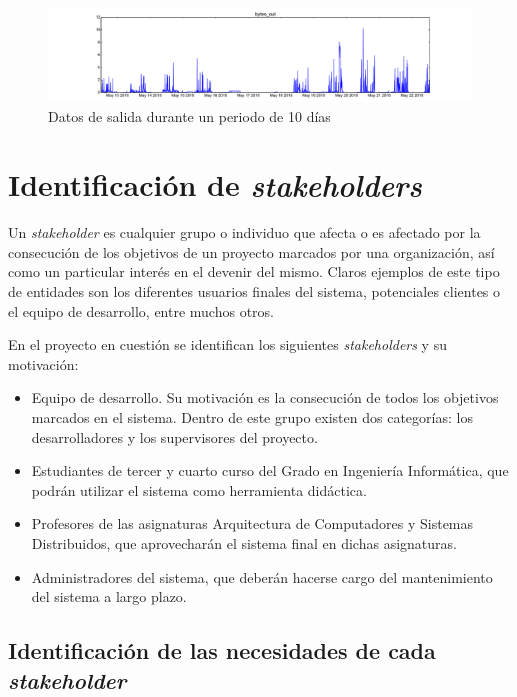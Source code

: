 \begin{figure}[H]
\centering
\includegraphics[width=\textwidth]{Chapters/Chapter4/Figures/data/bytes_out-2015-05-12_11:56:26-2015-05-22_12:56:12}
\caption{Datos de salida durante un periodo de 10 días}
\end{figure}

\section{Identificación de \textit{stakeholders}}

Un \textit{stakeholder} es cualquier grupo o individuo que afecta o es afectado por la consecución de los objetivos de un proyecto marcados por una organización, así como un particular interés en el devenir del mismo. Claros ejemplos de este tipo de entidades son los diferentes usuarios finales del sistema, potenciales clientes o el equipo de desarrollo, entre muchos otros.

En el proyecto en cuestión se identifican los siguientes \textit{stakeholders} y su motivación:

\begin{itemize}
  \item Equipo de desarrollo. Su motivación es la consecución de todos los objetivos marcados en el sistema. Dentro de este grupo existen dos categorías: los desarrolladores y los supervisores del proyecto.
  \item Estudiantes de tercer y cuarto curso del Grado en Ingeniería Informática, que podrán utilizar el sistema como herramienta didáctica.
  \item Profesores de las asignaturas Arquitectura de Computadores y Sistemas Distribuidos, que aprovecharán el sistema final en dichas asignaturas.
  \item Administradores del sistema, que deberán hacerse cargo del mantenimiento del sistema a largo plazo.
\end{itemize}

\subsection{Identificación de las necesidades de cada \textit{stakeholder}}

